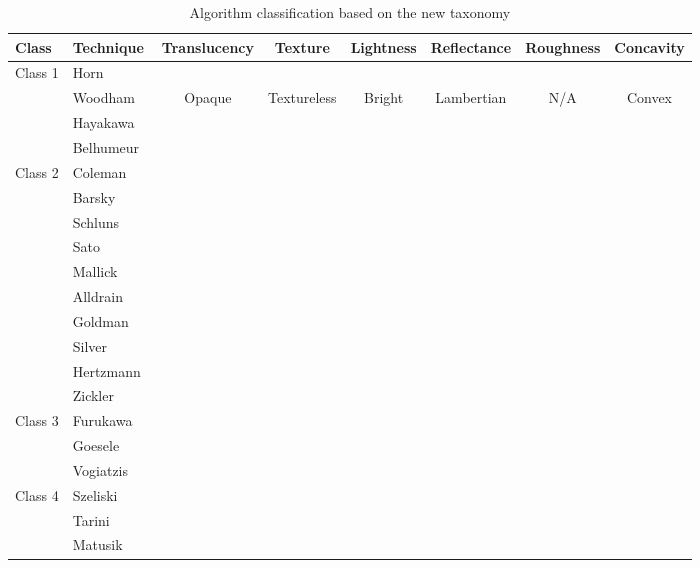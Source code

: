 \begin{landscape}
\centering
\begin{table}[h]
  \centering
  \begin{tabular}{*{2}{l}*{6}{c}}
  \hline
  \textbf{Class} & \textbf{Technique} & Translucency & Texture & Lightness & Reflectance & Roughness & Concavity\\
  \hline
  Class 1 & Horn~\cite{horn1989shape} \\
  & Woodham~\cite{woodham1980photometric} & Opaque & Textureless & Bright & Lambertian & N/A & Convex\\
  & Hayakawa~\cite{hayakawa1994photometric} \\
  & Belhumeur~\cite{belhumeur1999bas} \\
  \hline
  Class 2 & Coleman~\cite{coleman1982obtaining} \\
  & Barsky~\cite{barsky20034} \\
  & Schluns~\cite{schluns1993photometric} \\
  & Sato~\cite{sato1994temporal} \\
  & Mallick~\cite{mallick2005beyond} \\
  & Alldrain~\cite{alldrin2008photometric} \\
  & Goldman~\cite{goldman2010shape} \\
  & Silver~\cite{silver1980determining}\\
  & Hertzmann~\cite{hertzmann2005example} \\
  & Zickler~\cite{zickler2002helmholtz} \\
  \hline
  Class 3 & Furukawa~\cite{furukawa2010accurate} \\
  & Goesele~\cite{goesele2006multi} \\
  & Vogiatzis~\cite{vogiatzis2007multiview} \\
  \hline
  Class 4 & Szeliski~\cite{szeliski1993rapid} \\
  & Tarini~\cite{tarini2002marching} \\
  & Matusik~\cite{matusik2002efficient} \\
  \hline
  \end{tabular}
  \caption{Algorithm classification based on the new taxonomy}
  \label{tab:algo_taxo}
\end{table}
\end{landscape}

